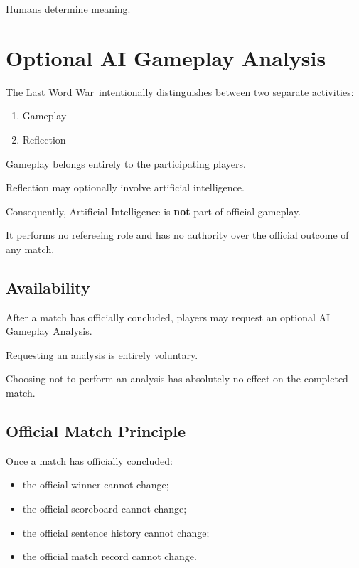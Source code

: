 \documentclass[11pt,a4paper]{article}
\begin{document}
Humans determine meaning.

\section{Optional AI Gameplay Analysis}

The Last Word War\texttrademark\ intentionally distinguishes between two separate activities:

\begin{enumerate}
    \item Gameplay
    \item Reflection
\end{enumerate}

Gameplay belongs entirely to the participating players.

Reflection may optionally involve artificial intelligence.

Consequently, Artificial Intelligence is \textbf{not} part of official gameplay.

It performs no refereeing role and has no authority over the official outcome of any match.

\subsection{Availability}

After a match has officially concluded, players may request an optional AI Gameplay Analysis.

Requesting an analysis is entirely voluntary.

Choosing not to perform an analysis has absolutely no effect on the completed match.

\subsection{Official Match Principle}

Once a match has officially concluded:

\begin{itemize}
    \item the official winner cannot change;
    \item the official scoreboard cannot change;
    \item the official sentence history cannot change;
    \item the official match record cannot change.
\end{itemize}
\end{document}
